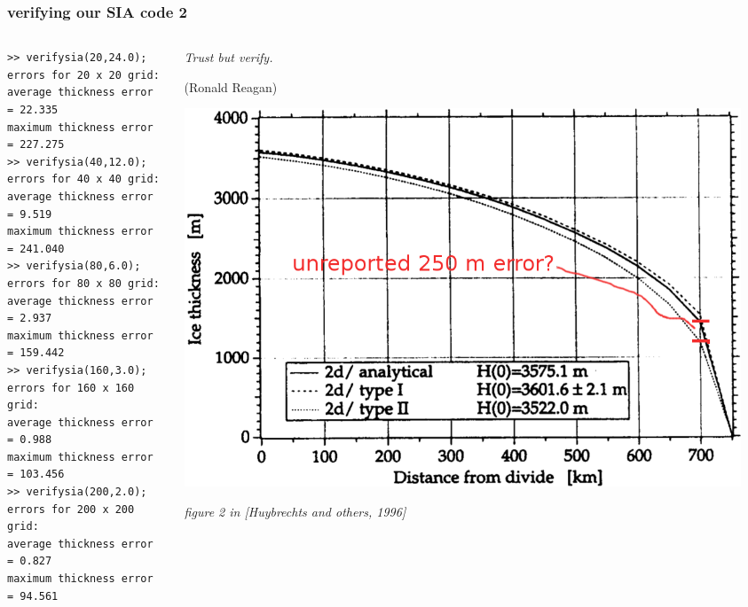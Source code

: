 \begin{frame}[fragile]
\frametitle{verifying our SIA code 2}

\begin{columns}
\begin{column}{0.65\textwidth}
\small
\begin{verbatim}
>> verifysia(20,24.0);
errors for 20 x 20 grid:
average thickness error  = 22.335
maximum thickness error  = 227.275
>> verifysia(40,12.0);
errors for 40 x 40 grid:
average thickness error  = 9.519
maximum thickness error  = 241.040
>> verifysia(80,6.0);
errors for 80 x 80 grid:
average thickness error  = 2.937
maximum thickness error  = 159.442
>> verifysia(160,3.0);
errors for 160 x 160 grid:
average thickness error  = 0.988
maximum thickness error  = 103.456
>> verifysia(200,2.0);
errors for 200 x 200 grid:
average thickness error  = 0.827
maximum thickness error  = 94.561
\end{verbatim}
\normalsize
\end{column}

\begin{column}{0.35\textwidth}
\small
\emph{Trust but verify.}
\medskip

\tiny (Ronald Reagan)

\bigskip\bigskip\bigskip

\includegraphics[width=0.95\textwidth]{photos/eismintone}

\scriptsize \emph{figure 2 in [Huybrechts and others, 1996]}\nocite{EISMINT96}
\end{column}
\end{columns}
\end{frame}


